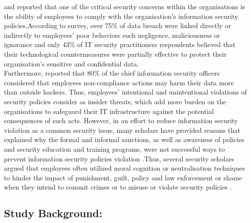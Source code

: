 \cite{Siponen2010} and \cite{Puhakainen2010} reported that one of the critical security concerns within the organisations is the ability of employees to comply with the organisation's information security policies.According to \citet{PonemonInstitute2012} survey, over 75\% of data breach were linked directly or indirectly to employees' poor behaviors such negligence, maliciousness or ignorance and only 43\% of IT security practitioners respondents believed that their technological countermeasures were partially effective to protect their organisation's sensitive and confidential data. \\
Furthermore,\cite{Barlow2013} reported that 80\% of the chief information security officers considered that employees non-compliance actions may harm their data more than outside hackers. Thus, employees' intentional and unintentional violations of security policies consider as insider threats, which add more burden on the organisations to safeguard their IT infrastructure against the potential consequences of such acts. However, in an effort to reduce information security violation as a common security issue, many scholars have provided reasons that explained why the formal and informal sanctions, as well as awareness of policies and security education and training programs, were not successful ways to prevent information security policies violation   \cite{Siponen2010,Darcy,Chen2012}.Thus, several security scholars argued that employees often utilized moral cognition or neutralisation techniques to hinder the impact of punishment, guilt, policy and law enforcement or shame when they intend to commit crimes or to misuse or violate security policies \cite{Siponen2010,Barlow2013,Teh2015,Sykes1957,Kim2014,Hinduja2007,Ingram2008}.\\

\subsection{Study Background:}


